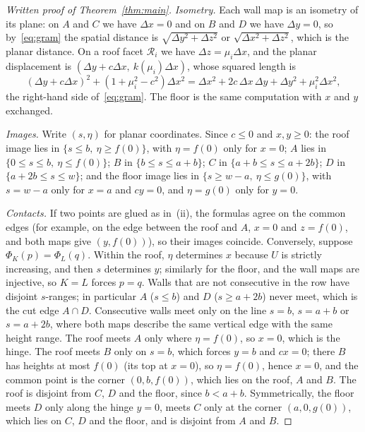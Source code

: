 \documentclass[11pt]{article}
\theoremstyle{definition}
\theoremstyle{remark}
\newcommand{\cR}{\mathcal R}
\begin{document}
\begin{proof}[Written proof of Theorem~\ref{thm:main}]
\emph{Isometry.} Each wall map is an isometry of its plane: on $A$ and $C$
we have $\Delta x=0$ and on $B$ and $D$ we have $\Delta y=0$, so
by~\eqref{eq:gram} the spatial distance is $\sqrt{\Delta y^2+\Delta z^2}$ or
$\sqrt{\Delta x^2+\Delta z^2}$, which is the planar distance. On a roof facet
$\cR_i$ we have $\Delta z=\mu_i\Delta x$, and the planar displacement is
$(\Delta y+c\Delta x,\ k(\mu_i)\Delta x)$, whose squared length is
\[
(\Delta y+c\Delta x)^2+(1+\mu_i^2-c^2)\Delta x^2
=\Delta x^2+2c\,\Delta x\,\Delta y+\Delta y^2+\mu_i^2\Delta x^2 ,
\]
the right-hand side of~\eqref{eq:gram}. The floor is the same computation with
$x$ and $y$ exchanged.

\emph{Images.} Write $(s,\eta)$ for planar coordinates. Since $c\le0$ and
$x,y\ge0$:
the roof image lies in $\{s\le b,\ \eta\ge f(0)\}$, with $\eta=f(0)$ only for
$x=0$; $A$ lies in $\{0\le s\le b,\ \eta\le f(0)\}$; $B$ in $\{b\le s\le a+b\}$;
$C$ in $\{a+b\le s\le a+2b\}$; $D$ in $\{a+2b\le s\le w\}$; and the floor
image lies in $\{s\ge w-a,\ \eta\le g(0)\}$, with $s=w-a$ only for $x=a$
and $cy=0$, and $\eta=g(0)$ only for $y=0$.

\emph{Contacts.} If two points are glued as in~(ii), the formulas agree on the common edges (for example, on the edge
between the roof and $A$, $x=0$ and $z=f(0)$, and both maps give $(y,f(0))$),
so their images coincide. Conversely, suppose $\Phi_K(p)=\Phi_L(q)$. Within
the roof, $\eta$ determines $x$ because $U$ is strictly increasing, and then
$s$ determines $y$; similarly for the floor, and the wall maps are injective,
so $K=L$ forces $p=q$. Walls that are not consecutive in the row have disjoint
$s$-ranges; in particular $A$ ($s\le b$) and $D$ ($s\ge a+2b$) never meet,
which is the cut edge $A\cap D$. Consecutive walls meet only on the line
$s=b$, $s=a+b$ or $s=a+2b$, where both maps describe the same vertical edge
with the same height range. The roof meets $A$ only where $\eta=f(0)$, so
$x=0$, which is the hinge. The roof meets $B$ only on $s=b$, which forces
$y=b$ and $cx=0$; there $B$ has heights at most $f(0)$ (its top at $x=0$),
so $\eta=f(0)$, hence $x=0$, and the common point is the corner $(0,b,f(0))$,
which lies on the roof, $A$ and $B$. The roof is disjoint from $C$, $D$ and
the floor, since $b<a+b$. Symmetrically, the floor meets $D$ only along the
hinge $y=0$, meets $C$ only at the corner $(a,0,g(0))$, which lies on $C$, $D$
and the floor, and is disjoint from $A$ and $B$.
\end{proof}
\end{document}
